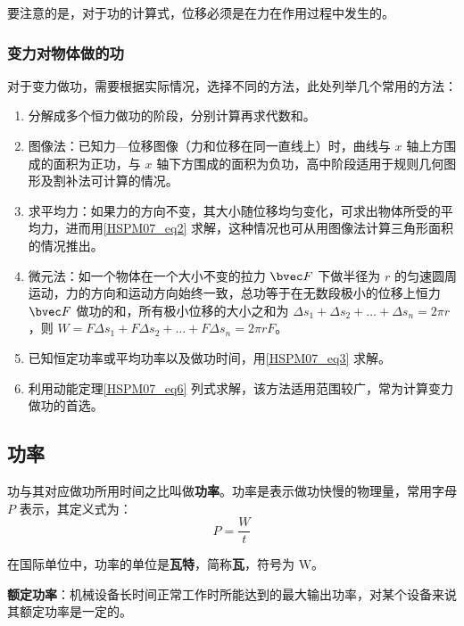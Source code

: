 要注意的是，对于功的计算式，位移必须是在力在作用过程中发生的。

\subsubsection{变力对物体做的功}

对于变力做功，需要根据实际情况，选择不同的方法，此处列举几个常用的方法：

\begin{enumerate}
\item 分解成多个恒力做功的阶段，分别计算再求代数和。

\item 图像法：已知力—位移图像（力和位移在同一直线上）时，曲线与 $x$ 轴上方围成的面积为正功，与 $x$ 轴下方围成的面积为负功，高中阶段适用于规则几何图形及割补法可计算的情况。

\item 求平均力：如果力的方向不变，其大小随位移均匀变化，可求出物体所受的平均力，进而用\autoref{HSPM07_eq2} 求解，这种情况也可从用图像法计算三角形面积的情况推出。

\item 微元法：如一个物体在一个大小不变的拉力 $\bvec F$ 下做半径为 $r$ 的匀速圆周运动，力的方向和运动方向始终一致，总功等于在无数段极小的位移上恒力 $\bvec F$ 做功的和，所有极小位移的大小之和为 $\Delta s_1+\Delta s_2+\dots+\Delta s_n=2\pi r$，则 $W=F\Delta s_1+F\Delta s_2+\dots+F\Delta s_n=2\pi rF$。

\item 已知恒定功率或平均功率以及做功时间，用\autoref{HSPM07_eq3} 求解。

\item 利用动能定理\autoref{HSPM07_eq6} 列式求解，该方法适用范围较广，常为计算变力做功的首选。
\end{enumerate}

\subsection{功率}

功与其对应做功所用时间之比叫做\textbf{功率}。功率是表示做功快慢的物理量，常用字母 $P$ 表示，其定义式为：
\begin{equation}\label{HSPM07_eq3}
P=\frac{W}{t}
\end{equation}

在国际单位中，功率的单位是\textbf{瓦特}，简称\textbf{瓦}，符号为 $\mathrm{W}$。

\textbf{额定功率}：机械设备长时间正常工作时所能达到的最大输出功率，对某个设备来说其额定功率是一定的。

